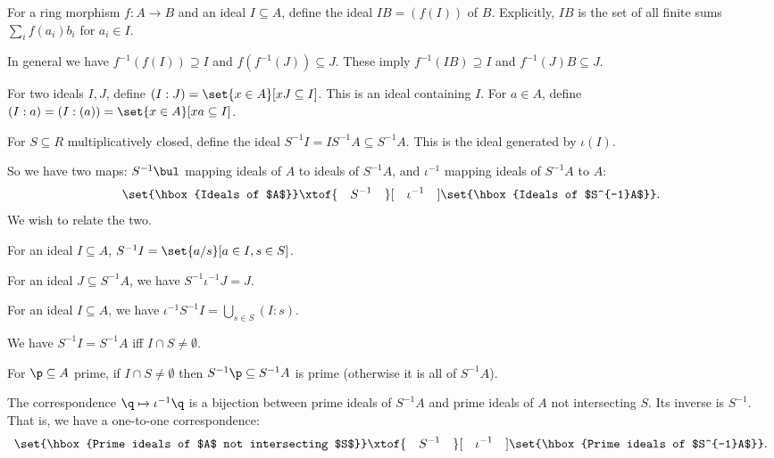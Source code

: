 \bdefn

    For a ring morphism $f\colon A\to B$ and an ideal $I\subseteq A$, define the ideal $IB=(f(I))$ of $B$.
    Explicitly, $IB$ is the set of all finite sums $\sum_if(a_i)b_i$ for $a_i\in I$.

\edefn

In general we have $f^{-1}(f(I))\supseteq I$ and $f(f^{-1}(J))\subseteq J$.
These imply $f^{-1}(IB)\supseteq I$ and $f^{-1}(J)B\subseteq J$.

\bdefn

    For two ideals $I,J$, define $(I:J)=\set{x\in A}[xJ\subseteq I]$.
    This is an ideal containing $I$.
    For $a\in A$, define $(I:a)=(I:(a))=\set{x\in A}[xa\subseteq I]$.

    For $S\subseteq R$ multiplicatively closed, define the ideal $S^{-1}I=IS^{-1}A\subseteq S^{-1}A$.
    This is the ideal generated by $\iota(I)$.

\edefn

So we have two maps: $S^{-1}\bul$ mapping ideals of $A$ to ideals of $S^{-1}A$, and $\iota^{-1}$ mapping ideals of $S^{-1}A$ to $A$:
$$ \set{\hbox{Ideals of $A$}} \xtof{\quad S^{-1}\quad}[\quad\iota^{-1}\quad] \set{\hbox{Ideals of $S^{-1}A$}} . $$
We wish to relate the two.

\bprop

    \benum
        \item For an ideal $I\subseteq A$, $S^{-1}I=\set{a/s}[a\in I,s\in S]$.
        \item For an ideal $J\subseteq S^{-1}A$, we have $S^{-1}\iota^{-1}J=J$.
        \item For an ideal $I\subseteq A$, we have $\iota^{-1}S^{-1}I=\bigcup_{s\in S}(I:s)$.
        \item We have $S^{-1}I=S^{-1}A$ iff $I\cap S\neq\emptyset$.
        \item For $\p\subseteq A$ prime, if $I\cap S\neq\emptyset$ then $S^{-1}\p\subseteq S^{-1}A$ is prime (otherwise it is all of $S^{-1}A$).
        \item The correspondence $\q\mapsto\iota^{-1}\q$ is a bijection between prime ideals of $S^{-1}A$ and prime ideals of $A$ not intersecting $S$.
        Its inverse is $S^{-1}$.
        That is, we have a one-to-one correspondence:
        $$ \set{\hbox{Prime ideals of $A$ not intersecting $S$}} \xtof{\quad S^{-1}\quad}[\quad\iota^{-1}\quad] \set{\hbox{Prime ideals of $S^{-1}A$}} . $$
    \eenum

\eprop

\bproof


